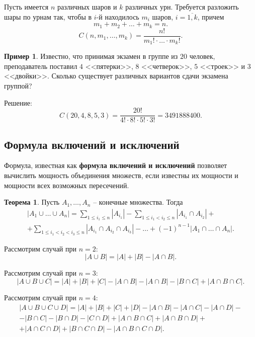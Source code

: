 \documentclass[a5paper, 11pt]{extarticle}
\theoremstyle{definition}
\newtheorem*{theorem*}{Теорема}
\newtheorem{example}{Пример}[subsection]
\theoremstyle{definition}
\theoremstyle{definition}
\numberwithin{figure}{section}
\numberwithin{table}{section}
\begin{document}
Пусть имеется \(n\) различных шаров и \(k\) различных урн. Требуется разложить шары по урнам так, чтобы в \(i\)-й находилось \(m_i\) шаров, \(i = \overline{1, k}\), причем
\[
    m_1 + m_2 + \ldots + m_k = n.
\]
\[
    C(n, m_1, \ldots, m_k) = \frac{n!}{m_1! \cdot \ldots \cdot m_k!}.
\]

\begin{example}
    Известно, что принимая экзамен в группе из \(20\) человек, преподаватель поставил \(4\) <<пятерки>>, \(8\) <<четверок>>, \(5\) <<троек>> и \(3\) <<двойки>>. Сколько существует различных вариантов сдачи экзамена группой?

    Решение:
    \[
        C(20, 4, 8, 5, 3) = \frac{20!}{4! \cdot 8! \cdot 5! \cdot 3!} = 3491888400.
    \]
\end{example}

\subsection{Формула включений и исключений}

Формула, известная как \textbf{формула включений и исключений} позволяет вычислить мощность объединения множеств, если известны их мощности и мощности всех возможных пересечений.

\begin{theorem*}
    Пусть \(A_1, \ldots, A_n\) -- конечные множества. Тогда
    \begin{gather*}
        |A_1 \cup \ldots \cup A_n| =
        \sum_{1 \leq i_1 \leq n} |A_{i_1}| - \sum_{1 \leq i_1 < i_2 \leq n} |A_{i_1} \cap A_{i_2}| + \\ + \sum_{1 \leq i_1 < i_2 < i_3 \leq n} |A_{i_1} \cap A_{i_2} \cap A_{i_3}| - \ldots + (-1)^{n - 1} |A_1 \cap \ldots \cap A_n|.
    \end{gather*}
\end{theorem*}

\noindent Рассмотрим случай при \(n = 2\):
\[
    |A \cup B| = |A| + |B| - |A \cap B|.
\]

\noindent Рассмотрим случай при \(n = 3\):
\[
    |A \cup B \cup C| = |A| + |B| + |C| - |A \cap B|  - |A \cap B| - |B \cap C| + |A \cap B \cap C|.
\]

\noindent Рассмотрим случай при \(n = 4\):
\begin{gather*}
    |A \cup B \cup C \cup D| =
    |A| + |B| + |C| + |D| - |A \cap B| - |A \cap C| - |A \cap D| - \\ - |B \cap C| - |B \cap D| - |C \cap D| + |A \cap B \cap C| + |A \cap B \cap D| + \\ + |A \cap C \cap D| + |B \cap C \cap D| - |A \cap B \cap C \cap D|.
\end{gather*}
\end{document}
